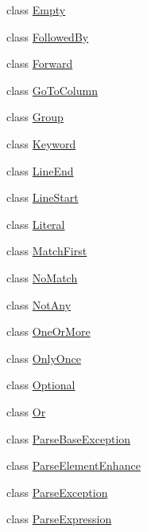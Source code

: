 \begin{DoxyCompactItemize}
\item 
class \hyperlink{classsetuptools_1_1__vendor_1_1pyparsing_1_1Empty}{Empty}
\item 
class \hyperlink{classsetuptools_1_1__vendor_1_1pyparsing_1_1FollowedBy}{Followed\+By}
\item 
class \hyperlink{classsetuptools_1_1__vendor_1_1pyparsing_1_1Forward}{Forward}
\item 
class \hyperlink{classsetuptools_1_1__vendor_1_1pyparsing_1_1GoToColumn}{Go\+To\+Column}
\item 
class \hyperlink{classsetuptools_1_1__vendor_1_1pyparsing_1_1Group}{Group}
\item 
class \hyperlink{classsetuptools_1_1__vendor_1_1pyparsing_1_1Keyword}{Keyword}
\item 
class \hyperlink{classsetuptools_1_1__vendor_1_1pyparsing_1_1LineEnd}{Line\+End}
\item 
class \hyperlink{classsetuptools_1_1__vendor_1_1pyparsing_1_1LineStart}{Line\+Start}
\item 
class \hyperlink{classsetuptools_1_1__vendor_1_1pyparsing_1_1Literal}{Literal}
\item 
class \hyperlink{classsetuptools_1_1__vendor_1_1pyparsing_1_1MatchFirst}{Match\+First}
\item 
class \hyperlink{classsetuptools_1_1__vendor_1_1pyparsing_1_1NoMatch}{No\+Match}
\item 
class \hyperlink{classsetuptools_1_1__vendor_1_1pyparsing_1_1NotAny}{Not\+Any}
\item 
class \hyperlink{classsetuptools_1_1__vendor_1_1pyparsing_1_1OneOrMore}{One\+Or\+More}
\item 
class \hyperlink{classsetuptools_1_1__vendor_1_1pyparsing_1_1OnlyOnce}{Only\+Once}
\item 
class \hyperlink{classsetuptools_1_1__vendor_1_1pyparsing_1_1Optional}{Optional}
\item 
class \hyperlink{classsetuptools_1_1__vendor_1_1pyparsing_1_1Or}{Or}
\item 
class \hyperlink{classsetuptools_1_1__vendor_1_1pyparsing_1_1ParseBaseException}{Parse\+Base\+Exception}
\item 
class \hyperlink{classsetuptools_1_1__vendor_1_1pyparsing_1_1ParseElementEnhance}{Parse\+Element\+Enhance}
\item 
class \hyperlink{classsetuptools_1_1__vendor_1_1pyparsing_1_1ParseException}{Parse\+Exception}
\item 
class \hyperlink{classsetuptools_1_1__vendor_1_1pyparsing_1_1ParseExpression}{Parse\+Expression}

\end{DoxyCompactItemize}
